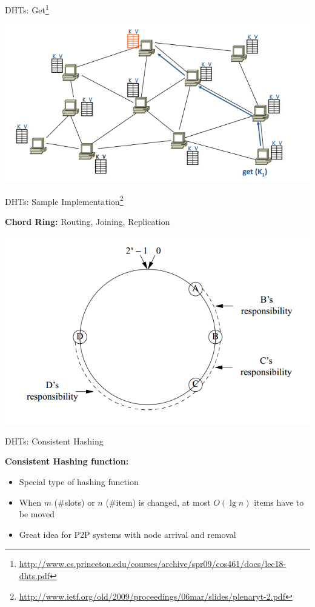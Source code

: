 \documentclass{beamer}
\begin{document}
\begin{frame}{DHTs: Get\footnote{\url{http://www.cs.princeton.edu/courses/archive/spr09/cos461/docs/lec18-dhts.pdf}}}

    \begin{center}
        \includegraphics[scale=0.4]{dhtGet.png}
    \end{center}
\end{frame}


\begin{frame}{DHTs: Sample Implementation\footnote{\url{http://www.ietf.org/old/2009/proceedings/06mar/slides/plenaryt-2.pdf}}}

    {\bf Chord Ring:} Routing, Joining, Replication
    \begin{center}
        \includegraphics[scale=0.4]{chordRing.png}
    \end{center}
\end{frame}

\begin{frame}{DHTs: Consistent Hashing}

    {\bf Consistent Hashing function:}
    \begin{itemize}
        \item Special type of hashing function
        \item When $m$ (\#slots) or $n$ (\#item) is changed,  at most $O(\lg n)$ items have to be moved
        \item Great idea for P2P systems with node arrival and removal
    \end{itemize}
\end{frame}
\end{document}
